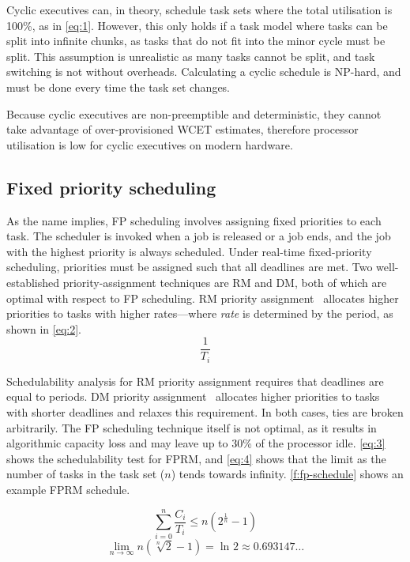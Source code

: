 Cyclic executives can, in theory, schedule task sets where the total utilisation is 100\%, as in \cref{eq:1}.
However, this only holds
if a task model where tasks can be split into infinite chunks, as tasks that do not fit into the
minor cycle must be split. This assumption is unrealistic as many tasks
cannot be split, and task switching is not without overheads. Calculating a cyclic schedule is
NP-hard, and must be done every time the task set changes.

Because cyclic executives are non-preemptible and deterministic, they cannot take advantage of 
over-provisioned \gls{WCET} estimates, therefore processor utilisation is low
for cyclic executives on modern hardware. 

\subsection{Fixed priority scheduling}
\label{s:fp}

As the name implies, \gls{FP} scheduling involves assigning fixed priorities to each task.
The scheduler is invoked when a job is released or a job ends, and the job with the highest priority is
always scheduled. Under real-time fixed-priority scheduling, priorities must be assigned such that
all deadlines are met. Two well-established priority-assignment techniques are \gls{RM} and \gls{DM}, both of which are optimal with respect to \gls{FP} scheduling.
\Gls{RM} priority assignment~\citep{Liu_Layland_73} allocates higher priorities to tasks with higher
rates---where \emph{rate} is determined by the period, as shown in \cref{eq:2}.
\begin{equation}
    \label{eq:2}
	\dfrac{1}{T_{i}}
\end{equation}

Schedulability analysis for \gls{RM} priority assignment requires that deadlines are equal to periods.
\Gls{DM} priority assignment~\citep{Leung_Whitehead_82} allocates higher priorities to tasks with shorter deadlines and relaxes this requirement.
In both cases, ties are broken arbitrarily.
The \gls{FP} scheduling technique itself is not optimal, as it results in algorithmic capacity loss
and may leave up to 30\% of the processor idle. \cref{eq:3} shows the schedulability test for
\gls{FPRM}, and \cref{eq:4} shows that the limit as the number of tasks in the task set ($n$) tends
towards infinity.
\cref{f:fp-schedule} shows an example \gls{FPRM} schedule.

\begin{equation}
    \label{eq:3}
    \sum\limits_{i=0}^n \dfrac{C_{i}}{T_{i}} \leq n(2^{\frac{1}{n}}-1)
\end{equation}
\begin{equation}
    \label{eq:4}
    \lim_{n \to \infty}n(\sqrt[n]{2}-1) = \ln_{} 2 \approx 0.693147\ldots
\end{equation}


